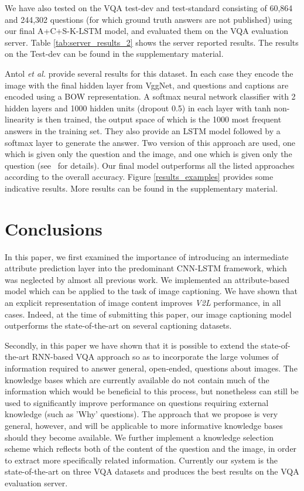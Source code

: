 \documentclass[10pt,journal,compsoc]{IEEEtran}
\newcommand{\etal}{\emph{et al.}}
\def\V2L{\textit{V2L}}
\begin{document}
We have also tested on the VQA test-dev and test-standard consisting of 60,864 and 244,302 questions (for which ground truth answers are not published) using our final A+C+S-K-LSTM model, and evaluated them on the VQA evaluation server. Table \ref{tab:server_results_2} shows the server reported results. The results on the Test-dev can be found in the supplementary material.

Antol \etal \cite{antol2015vqa} provide several results for this dataset. In each case they encode the image with the final hidden layer from VggNet, and questions and captions are encoded using a BOW representation. A softmax neural network classifier with 2 hidden layers and 1000 hidden units (dropout 0.5) in each layer with tanh non-linearity is then trained, the output space of which is the 1000 most frequent answers in the training set. They also provide an LSTM model followed by a softmax layer to generate the answer. Two version of this approach are used, one which is given only the question and the image, and one which is given only the question (see~\cite{antol2015vqa} for details). Our final model outperforms all the listed approaches according to the overall accuracy. Figure \ref{results_examples} provides some indicative results. More results can be found in the supplementary material.



 
\vspace{-8pt}
\section{Conclusions}



In this paper, we first examined the importance of introducing an intermediate attribute prediction layer into the predominant CNN-LSTM framework,
which was neglected by almost all previous work.
We implemented an attribute-based model which can be applied to the task of image captioning. We have shown that an explicit representation of image content improves \V2L performance, in all cases. Indeed, at the time of submitting this paper,
our image captioning model outperforms the state-of-the-art on several captioning datasets.



Secondly, in this paper we have shown that it is possible to extend the state-of-the-art RNN-based VQA approach so as to incorporate the large volumes of information required to answer general, open-ended, questions about images. The knowledge bases which are currently available do not contain much of the information which would be beneficial to this process, but nonetheless can still be used to significantly improve performance on questions requiring external knowledge (such as 'Why' questions).  The approach that we propose is very general, however, and will be applicable to more informative knowledge bases should they become available. We further implement a knowledge selection scheme which reflects both of the content of the question and the image, in order to extract more specifically related information. Currently our system is the state-of-the-art on three VQA datasets and produces the best results on the VQA evaluation server.
\end{document}
